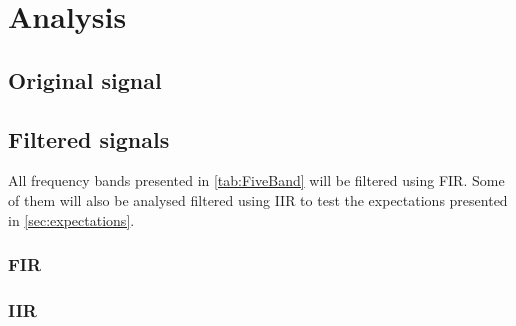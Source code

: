 
\section{Analysis}


\subsection{Original signal}

\subsection{Filtered signals}
All frequency bands presented in \cref{tab:FiveBand} will be filtered using FIR. Some of them will also be analysed filtered using IIR to test the expectations presented in \cref{sec:expectations}.

\subsubsection{FIR}

\subsubsection{IIR}